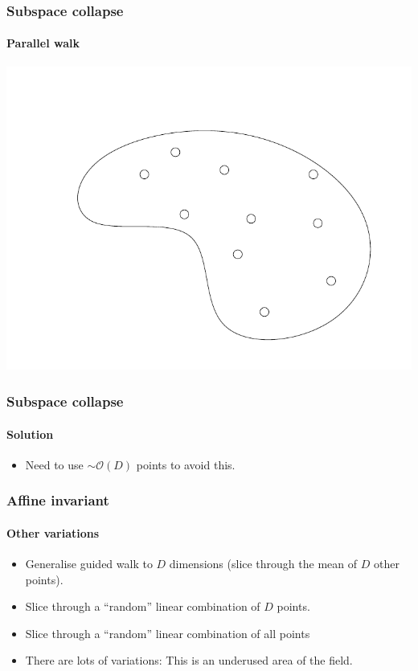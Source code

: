 \documentclass[%
]{beamer}
\begin{document}
\begin{frame}
  \frametitle{Subspace collapse}
  \framesubtitle{Parallel walk}
  \includegraphics[width=\textwidth,page=7]{figures/parallel_walk}
\end{frame}

\begin{frame}
  \frametitle{Subspace collapse}
  \framesubtitle{Solution}
  \begin{itemize}
    \pause\item Need to use $\sim\mathcal{O}(D)$ points to avoid this.
  \end{itemize}
\end{frame}


\begin{frame}
  \frametitle{Affine invariant}
  \framesubtitle{Other variations}
  \begin{itemize}
    \pause\item Generalise guided walk to $D$ dimensions (slice through the mean of $D$ other points).
    \pause\item Slice through a ``random'' linear combination of $D$ points.
    \pause\item Slice through a ``random'' linear combination of all points
    \pause\item There are lots of variations: This is an underused area of the field.
  \end{itemize}
\end{frame}
\end{document}
